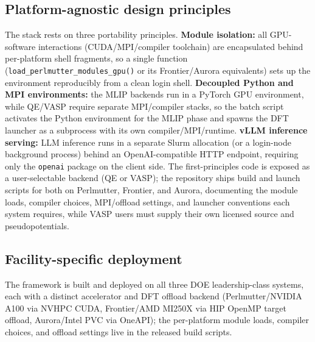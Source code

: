 \documentclass[11pt,a4paper]{article}
\def\ac#1{#1}%
\begin{document}
\subsection{Platform-agnostic design principles}
\label{sec:hpc:platform_design}
The stack rests on three portability principles. \textbf{Module isolation:} all
\ac{GPU}-software interactions (\ac{CUDA}/\ac{MPI}/compiler toolchain) are
encapsulated behind per-platform shell fragments, so a single function
(\texttt{load\_perlmutter\_modules\_gpu()} or its Frontier/Aurora equivalents)
sets up the environment reproducibly from a clean login shell.
\textbf{Decoupled Python and \ac{MPI} environments:} the \ac{MLIP} backends run
in a PyTorch \ac{GPU} environment, while \ac{QE}/\ac{VASP} require separate
\ac{MPI}/compiler stacks, so the batch script activates the Python environment
for the \ac{MLIP} phase and spawns the \ac{DFT} launcher as a subprocess with
its own compiler/\ac{MPI}/runtime. \textbf{vLLM inference serving:} \ac{LLM}
inference runs in a separate Slurm allocation (or a login-node background process)
behind an OpenAI-compatible \ac{HTTP} endpoint, requiring only the \texttt{openai}
package on the client side. The first-principles code is exposed as a
user-selectable backend (\ac{QE} or \ac{VASP}); the repository ships build and
launch scripts for both on Perlmutter, Frontier, and Aurora, documenting the
module loads, compiler choices, \ac{MPI}/offload settings, and launcher
conventions each system requires, while \ac{VASP} users must supply their own
licensed source and pseudopotentials.

\subsection{Facility-specific deployment}
\label{sec:hpc:platform_deployment}
The framework is built and deployed on all three \ac{DOE} leadership-class
systems, each with a distinct accelerator and \ac{DFT} offload backend
(Perlmutter/NVIDIA A100 via NVHPC \ac{CUDA}, Frontier/AMD MI250X via HIP OpenMP
target offload, Aurora/Intel \ac{PVC} via OneAPI); the per-platform module
loads, compiler choices, and offload settings live in the released build scripts.





\end{document}
